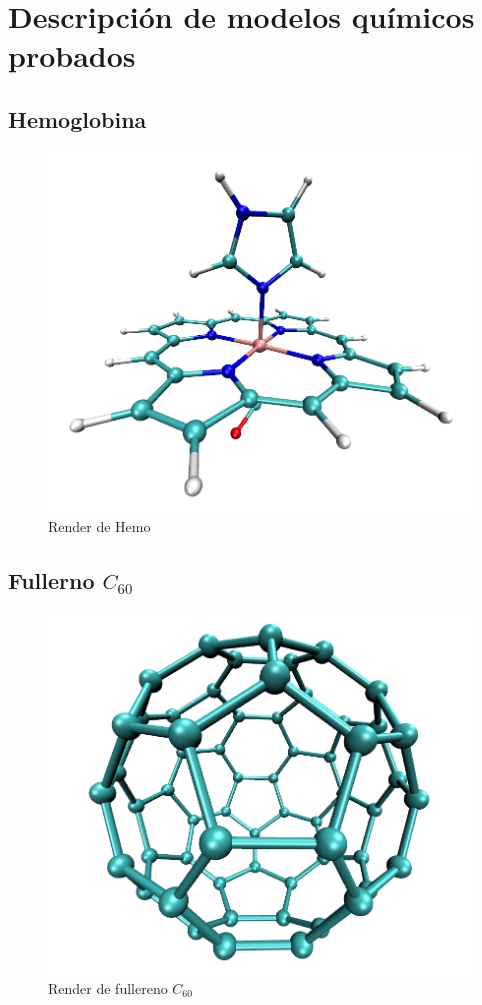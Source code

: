 \chapter{Descripci\'on de modelos qu\'imicos probados}
\label{detalle-grupos}

\section*{Hemoglobina}
\begin{figure}[htbp]
   \centering
   \includegraphics[width=\plotwidth]{images/hemo.png}
   \caption{Render de Hemo}
   \label{fig:render-hemo}
\end{figure}


\section*{Fullerno $C_{60}$}
\begin{figure}[htbp]
   \centering
   \includegraphics[width=\plotwidth]{images/fullereno.png}
   \caption{Render de fullereno $C_{60}$}
   \label{fig:render-fullereno}
\end{figure}


